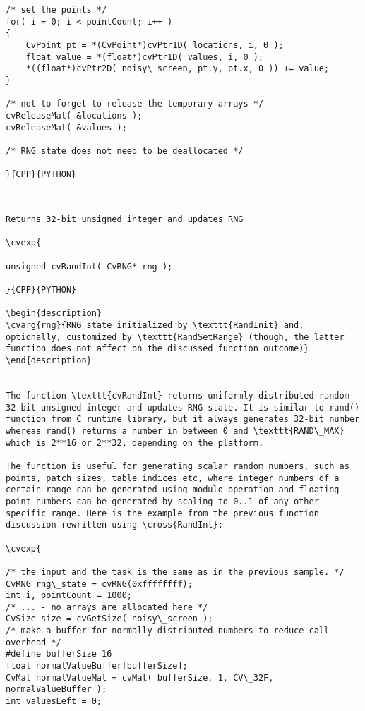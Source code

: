 \begin{verbatim}
/* set the points */
for( i = 0; i < pointCount; i++ )
{
    CvPoint pt = *(CvPoint*)cvPtr1D( locations, i, 0 );
    float value = *(float*)cvPtr1D( values, i, 0 );
    *((float*)cvPtr2D( noisy\_screen, pt.y, pt.x, 0 )) += value;
}

/* not to forget to release the temporary arrays */
cvReleaseMat( &locations );
cvReleaseMat( &values );

/* RNG state does not need to be deallocated */

}{CPP}{PYTHON}


\end{verbatim}
\begin{verbatim}

Returns 32-bit unsigned integer and updates RNG

\cvexp{

unsigned cvRandInt( CvRNG* rng );

}{CPP}{PYTHON}

\begin{description}
\cvarg{rng}{RNG state initialized by \texttt{RandInit} and, optionally, customized by \texttt{RandSetRange} (though, the latter function does not affect on the discussed function outcome)}
\end{description}


The function \texttt{cvRandInt} returns uniformly-distributed random 32-bit unsigned integer and updates RNG state. It is similar to rand() function from C runtime library, but it always generates 32-bit number whereas rand() returns a number in between 0 and \texttt{RAND\_MAX} which is 2**16 or 2**32, depending on the platform.

The function is useful for generating scalar random numbers, such as points, patch sizes, table indices etc, where integer numbers of a certain range can be generated using modulo operation and floating-point numbers can be generated by scaling to 0..1 of any other specific range. Here is the example from the previous function discussion rewritten using \cross{RandInt}:

\cvexp{

/* the input and the task is the same as in the previous sample. */
CvRNG rng\_state = cvRNG(0xffffffff);
int i, pointCount = 1000;
/* ... - no arrays are allocated here */
CvSize size = cvGetSize( noisy\_screen );
/* make a buffer for normally distributed numbers to reduce call overhead */
#define bufferSize 16
float normalValueBuffer[bufferSize];
CvMat normalValueMat = cvMat( bufferSize, 1, CV\_32F, normalValueBuffer );
int valuesLeft = 0;


\end{verbatim}
